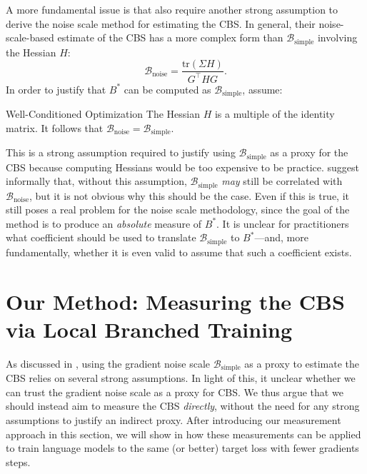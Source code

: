 \documentclass{article}
\newcommand{\hanna}[1]{\textcolor{purple}{[Hanna]: #1}}
\begin{document}
A more fundamental issue is that \citet{mccandlish2018empirical} also require another strong assumption to derive the noise scale method for estimating the CBS.
In general, their noise-scale-based estimate of the CBS has a more complex form than $\mathcal B_\mathrm{simple}$ involving the Hessian $H$:
\begin{equation*}
    \mathcal B_\mathrm{noise} = \frac{\mathrm{tr}(\Sigma H)}{G^\top H G} .
\end{equation*}
In order to justify that $B^*$ can be computed as $\mathcal B_\mathrm{simple}$,
\citet{mccandlish2018empirical} assume:

\begin{assumptionbox}{Well-Conditioned Optimization \citep{mccandlish2018empirical}}
    The Hessian $H$ is a multiple of the identity matrix. It follows that $\mathcal B_\mathrm{noise} = \mathcal B_\mathrm{simple}$.
\end{assumptionbox}

This is a strong assumption required to justify using $\mathcal B_\mathrm{simple}$ as a proxy for the CBS because computing Hessians would be too expensive to be practice.
\citet{mccandlish2018empirical} suggest informally that, without this assumption, $\mathcal B_\mathrm{simple}$ \emph{may} still be correlated with $\mathcal B_\mathrm{noise}$, but it is not obvious why this should be the case.
Even if this is true, it still poses a real problem for the noise scale methodology, since the goal of the method is to produce an \emph{absolute} measure of $B^*$. It is unclear for practitioners what coefficient should be used to translate $\mathcal B_\mathrm{simple}$ to $B^*$---and, more fundamentally, whether it is even valid to assume that such a coefficient exists.

\section{Our Method: Measuring the CBS via Local Branched Training} \label{sec:our-method}

As discussed in , using the gradient noise scale $\mathcal B_\textrm{simple}$ as a proxy to estimate the CBS relies on several strong assumptions.
In light of this, it unclear whether we can trust the gradient noise scale as a proxy for CBS.
We thus argue that we should instead aim to measure the CBS \emph{directly}, without the need for any strong assumptions to justify an indirect proxy.
After introducing our measurement approach in this section, we will show in  how these measurements can be applied to train language models to the same (or better) target loss with fewer gradients steps.
\end{document}
